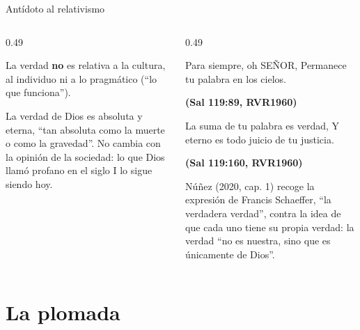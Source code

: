 \documentclass[hyperref={bookmarks=false},aspectratio=169]{beamer}
\newcommand{\SENOR}{S{\fontsize{0.78em}{1em}\selectfont EÑOR}}
\newcommand{\fuente}[1]{\par\hfill{\upshape\bfseries\footnotesize\textcolor{azul}{#1}}}
\begin{document}
\begin{frame}{Antídoto al relativismo}
\begin{columns}[t,onlytextwidth]
\begin{column}{0.49\textwidth}
\begin{tcolorbox}[colback=gris!12,colframe=gris,boxrule=0.8pt,arc=3pt,fonttitle=\bfseries\small,title=Rechazo]
\small La verdad \textbf{no} es relativa a la cultura, al individuo ni a lo pragmático (``lo que funciona'').
\end{tcolorbox}
\begin{tcolorbox}[colback=papiro,colframe=azul,boxrule=1pt,arc=3pt,fonttitle=\bfseries\small,title=Afirmación]
\small La verdad de Dios es absoluta y eterna, ``tan absoluta como la muerte o como la gravedad''. No cambia con la opinión de la sociedad: lo que Dios llamó profano en el siglo I lo sigue siendo hoy.
\end{tcolorbox}
\end{column}
\begin{column}{0.49\textwidth}
\begin{cita}Para siempre, oh \SENOR{}, Permanece tu palabra en los cielos.\fuente{(Sal 119:89, RVR1960)}\end{cita}
\begin{cita}La suma de tu palabra es verdad, Y eterno es todo juicio de tu justicia.\fuente{(Sal 119:160, RVR1960)}\end{cita}
\scriptsize Núñez (2020, cap. 1) recoge la expresión de Francis Schaeffer, ``la verdadera verdad'', contra la idea de que cada uno tiene su propia verdad: la verdad ``no es nuestra, sino que es únicamente de Dios''.
\end{column}
\end{columns}
\end{frame}

\section{La plomada}
\end{document}
